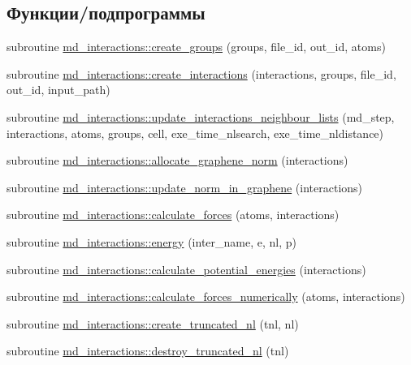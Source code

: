 \subsection*{Функции/подпрограммы}
\begin{DoxyCompactItemize}
\item 
subroutine \mbox{\hyperlink{namespacemd__interactions_a52c7d3a0c8df2f15b75c8fef73ee795d}{md\+\_\+interactions\+::create\+\_\+groups}} (groups, file\+\_\+id, out\+\_\+id, atoms)
\item 
subroutine \mbox{\hyperlink{namespacemd__interactions_ad655aab8b55d15d13e66769ae95ca229}{md\+\_\+interactions\+::create\+\_\+interactions}} (interactions, groups, file\+\_\+id, out\+\_\+id, input\+\_\+path)
\item 
subroutine \mbox{\hyperlink{namespacemd__interactions_a311e6b53338f1b89611eec1929a6387e}{md\+\_\+interactions\+::update\+\_\+interactions\+\_\+neighbour\+\_\+lists}} (md\+\_\+step, interactions, atoms, groups, cell, exe\+\_\+time\+\_\+nlsearch, exe\+\_\+time\+\_\+nldistance)
\item 
subroutine \mbox{\hyperlink{namespacemd__interactions_aba3551fb4bd5364e9cbcfbe81dd6aca9}{md\+\_\+interactions\+::allocate\+\_\+graphene\+\_\+norm}} (interactions)
\item 
subroutine \mbox{\hyperlink{namespacemd__interactions_a0f767aead142dc9f1f692172a21a590a}{md\+\_\+interactions\+::update\+\_\+norm\+\_\+in\+\_\+graphene}} (interactions)
\item 
subroutine \mbox{\hyperlink{namespacemd__interactions_a851acddc07bbaa6d08cf33c60a9e6822}{md\+\_\+interactions\+::calculate\+\_\+forces}} (atoms, interactions)
\item 
subroutine \mbox{\hyperlink{namespacemd__interactions_a5b3213ff25495c56eeabce8427fb3082}{md\+\_\+interactions\+::energy}} (inter\+\_\+name, e, nl, p)
\item 
subroutine \mbox{\hyperlink{namespacemd__interactions_a846dbc2db901133c72ff58afb321e918}{md\+\_\+interactions\+::calculate\+\_\+potential\+\_\+energies}} (interactions)
\item 
subroutine \mbox{\hyperlink{namespacemd__interactions_a49c070421fed83b68f06a9b8b7f92048}{md\+\_\+interactions\+::calculate\+\_\+forces\+\_\+numerically}} (atoms, interactions)
\item 
subroutine \mbox{\hyperlink{namespacemd__interactions_aac3f945d504b95d25098bb5d5d5f4208}{md\+\_\+interactions\+::create\+\_\+truncated\+\_\+nl}} (tnl, nl)
\item 
subroutine \mbox{\hyperlink{namespacemd__interactions_a36f14223ced172ec4c9a9bc381384b55}{md\+\_\+interactions\+::destroy\+\_\+truncated\+\_\+nl}} (tnl)

\end{DoxyCompactItemize}
